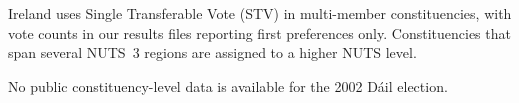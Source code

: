 Ireland uses Single Transferable Vote (STV) in multi-member constituencies,
with vote counts in our results files reporting first preferences only.
Constituencies that span several NUTS~3 regions are assigned to a higher NUTS level.

No public constituency-level data is available for the 2002 Dáil election. 
